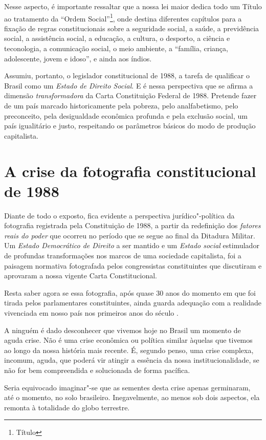 Nesse aspecto, é importante ressaltar que a nossa lei maior dedica todo
um Título ao tratamento da ``Ordem Social''\footnote{Título },
onde destina diferentes capítulos para a fixação de regras
constitucionais sobre a seguridade social, a saúde, a
previdência social, a assistência social, a
educação, a cultura, o desporto, a ciência e
teconologia, a comunicação social, o meio ambiente, a
``família, criança, adolescente, jovem e idoso'', e ainda aos
índios.

Assumiu, portanto, o legislador constitucional de 1988, a tarefa de
qualificar o Brasil como um \emph{Estado de Direito Social}. E é nessa
perspectiva que se afirma a dimensão \emph{transformadora} da Carta
Constituição Federal de 1988. Pretende fazer de um país marcado
historicamente pela pobreza, pelo analfabetismo, pelo preconceito, pela
desigualdade econômica profunda e pela exclusão social, um país
igualitário e justo, respeitando os parâmetros básicos do modo de
produção capitalista.

\section{A crise da fotografia constitucional de 1988}

Diante de todo o exposto, fica evidente a perspectiva jurídico"-política
da fotografia registrada pela Constituição de 1988, a partir da
redefinição dos \emph{fatores reais do poder} que ocorreu no período que
se segue ao final da Ditadura Militar. Um \emph{Estado Democrático de
Direito} a ser mantido e um \emph{Estado social} estimulador de
profundas transformações nos marcos de uma sociedade capitalista, foi a
paisagem normativa fotografada pelos congressistas constituintes que
discutiram e aprovaram a nossa vigente Carta Constitucional.

Resta saber agora se essa fotografia, após quase 30 anos do momento em
que foi tirada pelos parlamentares constituintes, ainda guarda adequação
com a realidade vivenciada em nosso país nos primeiros anos do século
.

A ninguém é dado desconhecer que vivemos hoje no Brasil um momento de
aguda crise. Não é uma crise econômica ou política similar àquelas que
tivemos ao longo da nossa história mais recente. É, segundo penso, uma
crise complexa, incomum, aguda, que poderá vir atingir a essência da
nossa institucionalidade, se não for bem compreendida e solucionada de
forma pacífica.

Seria equivocado imaginar"-se que as sementes desta crise apenas
germinaram, até o momento, no solo brasileiro. Inegavelmente, ao menos
sob dois aspectos, ela remonta à totalidade do globo terrestre.

